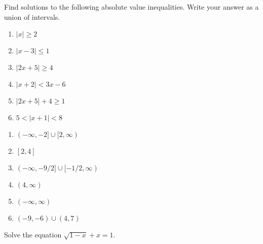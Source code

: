 \begin{enumialphparenastyle}
\begin{ex}
Find solutions to the following absolute value inequalities. Write your answer as a union of intervals.
\begin{multicols}{2}
\begin{enumerate}
	\item	$|x|\geq 2$
	\item	$|x-3|\leq 1$
	\item	$|2x+5|\geq 4$
	\item	$|x+2|<3x-6$
	\item	$|2x+5|+4\geq 1$
	\item	$5<|x+1|<8$
\end{enumerate}
\end{multicols}
\begin{sol}
\begin{multicols}{2}
\begin{enumerate}
	\item	$(-\infty,-2]\cup[2,\infty)$
	\item	$[2,4]$
	\item	$(-\infty,-9/2]\cup[-1/2,\infty)$
	\item	$(4,\infty)$
	\item	$(-\infty,\infty)$
	\item	$(-9,-6)\cup(4,7)$
\end{enumerate}
\end{multicols}
\end{sol}
\end{ex}

\begin{ex}
Solve the equation $\sqrt{1-x}+x=1$.
\end{ex}

\end{enumialphparenastyle}